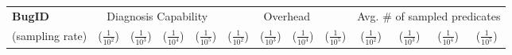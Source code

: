 \begin{table*}
  \centering
  \footnotesize
  \newcommand{\Yes}[1]{\checkmark{}$_#1$}
  \newcommand{\No}[0]{-}
  \begin{tabular}{lcccccccccccc}
    \toprule     
   {\bf BugID} & \multicolumn{4}{c}{ Diagnosis Capability} &\multicolumn{4}{c}{Overhead} & \multicolumn{4}{c}{Avg. \# of sampled predicates} \\
                           
    \cmidrule(lr){2-5}
    \cmidrule(lr){6-9}
    \cmidrule(lr){10-13}
    (sampling rate)  &($\frac{1}{10^2}$)&($\frac{1}{10^3}$)&($\frac{1}{10^4}$)& ($\frac{1}{10^5}$)  &($\frac{1}{10^2}$) &($\frac{1}{10^3}$)&($\frac{1}{10^4}$)  & ($\frac{1}{10^5}$)  & ($\frac{1}{10^2}$)  & ($\frac{1}{10^3}$)    & ($\frac{1}{10^4}$)   &  ($\frac{1}{10^5}$)         \\
    \midrule 


\end{tabular}
\end{table*}
